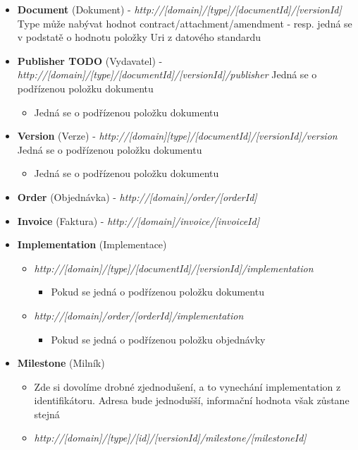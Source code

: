 \begin{itemize}
\item \textbf{Document} (Dokument) - \textit{http://[domain]/[type]/[documentId]/[versionId]}
Type může nabývat hodnot contract/attachment/amendment - resp. jedná se v podstatě o hodnotu položky Uri z datového standardu
\item \textbf{Publisher TODO} (Vydavatel) -\\\textit{http://[domain]/[type]/[documentId]/[versionId]/publisher}
Jedná se o podřízenou položku dokumentu 
	\begin{itemize}
	\item Jedná se o podřízenou položku dokumentu 
	\end{itemize}
\item \textbf{Version} (Verze) - \textit{http://[domain][type]/[documentId]/[versionId]/version}
Jedná se o podřízenou položku dokumentu 
	\begin{itemize}
	\item Jedná se o podřízenou položku dokumentu 
	\end{itemize}
\item \textbf{Order} (Objednávka) - \textit{http://[domain]/order/[orderId]}
\item \textbf{Invoice} (Faktura) - \textit{http://[domain]/invoice/[invoiceId]}
\item \textbf{Implementation} (Implementace)
	\begin{itemize}
	\item \textit{http://[domain]/[type]/[documentId]/[versionId]/implementation}
		\begin{itemize}
		\item Pokud se jedná o podřízenou položku dokumentu
		\end{itemize}
	\item \textit{http://[domain]/order/[orderId]/implementation}
		\begin{itemize}
		\item Pokud se jedná o  podřízenou položku objednávky
		\end{itemize}
	\end{itemize}
\item \textbf{Milestone} (Milník) 
\begin{itemize}
	\item Zde si dovolíme drobné zjednodušení, a to vynechání implementation z identifikátoru. Adresa bude jednodušší, informační hodnota však zůstane stejná
	\item \textit{http://[domain]/[type]/[id]/[versionId]/milestone/[milestoneId]}

\end{itemize}
\end{itemize}
